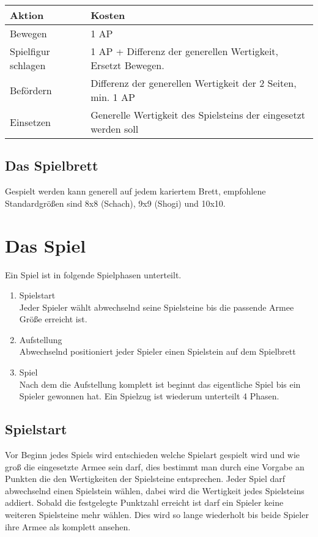 \documentclass{article}
\begin{document}
	\begin{tabular}{ll}
	\hline
	Aktion & Kosten \\ \hline
	Bewegen &  1 AP \\
	Spielfigur schlagen & 1 AP + Differenz der generellen Wertigkeit, Ersetzt Bewegen. \\
	Befördern & Differenz der generellen Wertigkeit der 2 Seiten, min. 1 AP \\
	Einsetzen 	 
	& Generelle Wertigkeit des Spielsteins der eingesetzt werden soll \\ \hline
	\end{tabular} 
	
	

\subsection{Das Spielbrett}
	Gespielt werden kann generell auf jedem kariertem Brett, empfohlene Standardgrößen sind
	8x8 (Schach), 9x9 (Shogi) und 10x10.
	

\section{Das Spiel}

	Ein Spiel ist in folgende Spielphasen unterteilt.

	\begin{enumerate}
	\item Spielstart \\
	 	  Jeder Spieler wählt abwechselnd seine Spielsteine bis die passende Armee Größe erreicht ist.
	\item Aufstellung \\
	  	  Abwechselnd positioniert jeder Spieler einen Spielstein auf dem Spielbrett
	\item Spiel \\
	  	  Nach dem die Aufstellung komplett ist beginnt das eigentliche Spiel bis ein Spieler gewonnen hat.
	  	  Ein Spielzug ist wiederum unterteilt 4 Phasen.
	\end{enumerate}


\subsection{Spielstart}
	Vor Beginn jedes Spiels wird entschieden welche Spielart gespielt wird und wie groß die eingesetzte Armee sein darf,
	dies bestimmt man durch eine Vorgabe an Punkten die den Wertigkeiten der Spielsteine entsprechen.
	Jeder Spiel darf abwechselnd einen Spielstein wählen, dabei wird die Wertigkeit jedes Spielsteins addiert.
	Sobald die festgelegte Punktzahl erreicht ist darf ein Spieler keine weiteren Spielsteine mehr wählen.
	Dies wird so lange wiederholt bis beide Spieler ihre Armee als komplett ansehen.
\end{document}
